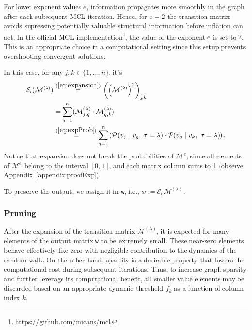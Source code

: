 For lower exponent values \(e\), information propagates more smoothly in the graph after each subsequent MCL iteration. Hence, for \(e=2\) the transition matrix avoids supressing potentially valuable structural information before inflation can act.
In the official MCL implementation\footnote{\url{https://github.com/micans/mcl}.}, the value of the exponent \(e\) is set to \(2\). This is an appropriate choice in a computational setting since this setup prevents overshooting convergent solutions.

In this case, for any \(j,k \in \{ 1, \dots, n \}\), it's
\begin{align*}
  \mathcal{E}_{\epsilon}(\mathcal{M}^{(\lambda)})
  & \overset{(\ref{eq:expansion})}{=} \left(\left( \mathcal{M}^{(\lambda)} \right)^2\right)_{j, k}
  \\
  & = \sum_{q = 1}^{n} ( \mathcal{M}^{(\lambda)}_{j, q} \cdot \mathcal{M}^{(\lambda)}_{q, k} )
  \\
  & \overset{(\ref{eq:expProb})}{=} \sum_{q = 1}^{n} \left( \mathcal{P}(v_j \ | \ v_q, \ \tau = \lambda) \cdot \mathcal{P}(v_q \ | \ v_k, \ \tau = \lambda) \right). 
\end{align*}
Notice that expansion does not break the probabilities of \(\mathcal{M}^e\), since all elements of \(\mathcal{M}^e\) belong to the interval \([0, 1]\), and each matrix column sums to 1 (observe Appendix~\ref{appendix:proofExp}).

To preserve the output, we assign it in \texttt{w}, i.e., \(w := \mathcal{E}_e \mathcal{M}^{(\lambda)}\).

\subsubsection{Pruning}

After the expansion of the transition matrix \(\mathcal{M}^{(\lambda)}\), it is expected for many elements of the output matrix \texttt{w} to be extremely small.
These near-zero elements behave effectively like zero with negligible contribution to the dynamics of the random walk. On the other hand, sparsity is a desirable property that lowers the computational cost during subsequent iterations.
Thus, to increase graph sparsity and further leverage its computational benefit, all smaller value elements may be discarded based on an appropriate dynamic threshold \(f_k\) as a function of column index \(k\).

